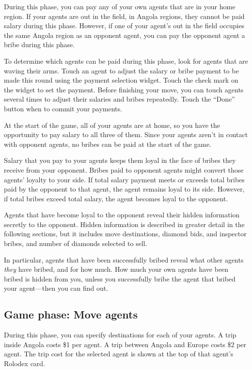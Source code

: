 \documentclass[8pt]{extbook}
\begin{document}
During this phase, you can pay any of your own agents that are in your home region.  If your agents are out in the field, in Angola regions, they cannot be paid salary during this phase.  However, if one of your agent's out in the field occupies the same Angola region as an opponent agent, you can pay the opponent agent a bribe during this phase.

To determine which agents can be paid during this phase, look for agents that are waving their arms.  Touch an agent to adjust the salary or bribe payment to be made this round using the payment selection widget.  Touch the check mark on the widget to set the payment.  Before finishing your move, you can touch agents several times to adjust their salaries and bribes repeatedly.  Touch the ``Done'' button when to commit your payments. 

At the start of the game, all of your agents are at home, so you have the opportunity to pay salary to all three of them.  Since your agents aren't in contact with opponent agents, no bribes can be paid at the start of the game.

Salary that you pay to your agents keeps them loyal in the face of bribes they receive from your opponent.  Bribes paid to opponent agents might convert those agents' loyalty to your side.  If total salary payment meets or exceeds total bribes paid by the opponent to that agent, the agent remains loyal to its side.  However, if total bribes exceed total salary, the agent becomes loyal to the opponent.

Agents that have become loyal to the opponent reveal their hidden information secretly to the opponent.  Hidden information is described in greater detail in the following sections, but it includes move destinations, diamond bids, and inspector bribes, and number of diamonds selected to sell.

In particular, agents that have been successfully bribed reveal what other agents {\it they} have bribed, and for how much.  How much your own agents have been bribed is hidden from you, unless you successfully bribe the agent that bribed your agent---then you can find out.

\subsection{Game phase:  Move agents}

During this phase, you can specify destinations for each of your agents.  A trip inside Angola costs \$1 per agent.  A trip between Angola and Europe costs \$2 per agent.  The trip cost for the selected agent is shown at the top of that agent's Rolodex card.
\end{document}
